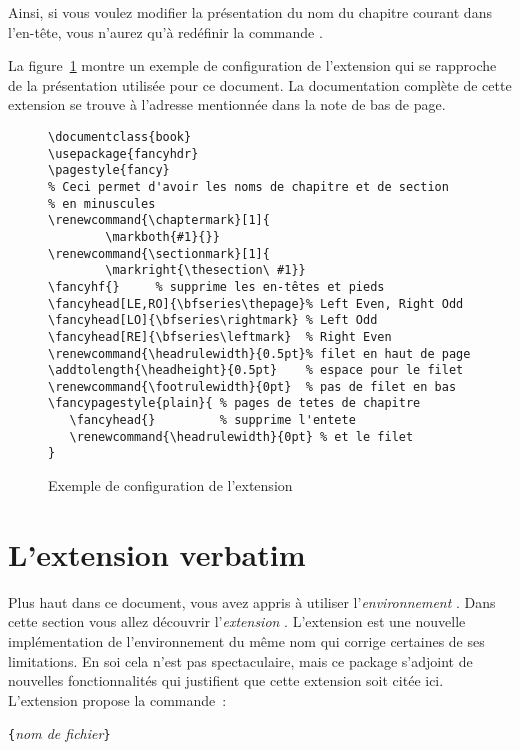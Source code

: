 Ainsi, si vous voulez modifier la présentation du nom du chapitre
courant dans l'en-tête, vous n'aurez qu'à redéfinir la commande
. 

La figure~\ref{fancyhdr} montre un exemple de configuration de l'extension
 qui se rapproche de la présentation utilisée pour ce
document. La documentation complète de cette extension se trouve à
l'adresse mentionnée dans la note de bas de page.

\begin{figure}[!htbp]
\begin{lined}{\textwidth}
\begin{verbatim}
\documentclass{book}
\usepackage{fancyhdr}
\pagestyle{fancy}
% Ceci permet d'avoir les noms de chapitre et de section
% en minuscules
\renewcommand{\chaptermark}[1]{
        \markboth{#1}{}}
\renewcommand{\sectionmark}[1]{
        \markright{\thesection\ #1}}
\fancyhf{}     % supprime les en-têtes et pieds
\fancyhead[LE,RO]{\bfseries\thepage}% Left Even, Right Odd
\fancyhead[LO]{\bfseries\rightmark} % Left Odd
\fancyhead[RE]{\bfseries\leftmark}  % Right Even
\renewcommand{\headrulewidth}{0.5pt}% filet en haut de page
\addtolength{\headheight}{0.5pt}    % espace pour le filet
\renewcommand{\footrulewidth}{0pt}  % pas de filet en bas
\fancypagestyle{plain}{ % pages de tetes de chapitre
   \fancyhead{}         % supprime l'entete
   \renewcommand{\headrulewidth}{0pt} % et le filet
}
\end{verbatim}
\end{lined}
\caption{Exemple de configuration de l'extension }%
\label{fancyhdr}
\end{figure}


\section{L'extension verbatim}

Plus haut dans ce document, vous avez appris à utiliser
l'\emph{environnement} . Dans cette section vous allez découvrir
l'\emph{extension} . L'extension  est une
nouvelle implémentation de l'environnement du même nom qui corrige
certaines de ses limitations. En soi cela n'est pas spectaculaire,
mais ce package s'adjoint de nouvelles fonctionnalités
qui justifient que cette extension soit citée ici. L'extension
 propose la commande~:

\begin{lscommand}
\verb|{|\emph{nom de fichier}\verb|}|
\end{lscommand}

